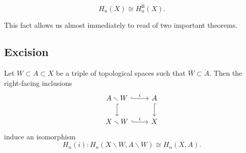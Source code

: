 \documentclass[main.tex]{subfiles}
\begin{document}
\begin{corollary}
  \begin{equation*}
    H_{n}(X) \cong H^{\mathfrak{U}}_{n}(X).
  \end{equation*}
\end{corollary}

This fact allows us almost immediately to read of two important theorems.

\subsection{Excision}
\label{ssc:excision}

\begin{theorem}[excision]
  Let $W \subset A \subset X$ be a triple of topological spaces such that $\bar{W} \subset \mathring{A}$. Then the right-facing inclusions
  \begin{equation*}
    \begin{tikzcd}
      A \smallsetminus W
      \arrow[r, hook, "i"]
      \arrow[d, hook]
      & A
      \arrow[d, hook]
      \\
      X \smallsetminus W
      \arrow[r, hook, "i"]
      & X
    \end{tikzcd}
  \end{equation*}
  induce an isomorphism
  \begin{equation*}
    H_{n}(i)\colon H_{n}(X \smallsetminus W, A \smallsetminus W) \cong H_{n}(X, A).
  \end{equation*}
\end{theorem}
\end{document}
